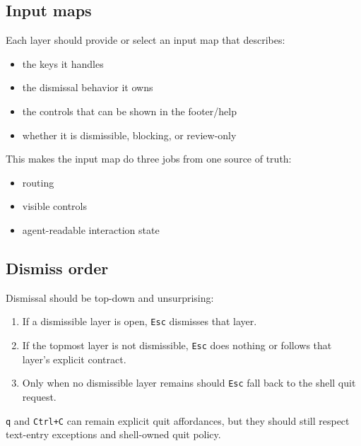 \subsection{Input maps}\label{record-254-input-maps}

Each layer should provide or select an input map that describes:

\begin{itemize}
\tightlist
\item
  the keys it handles
\item
  the dismissal behavior it owns
\item
  the controls that can be shown in the footer/help
\item
  whether it is dismissible, blocking, or review-only
\end{itemize}

This makes the input map do three jobs from one source of truth:

\begin{itemize}
\tightlist
\item
  routing
\item
  visible controls
\item
  agent-readable interaction state
\end{itemize}

\subsection{Dismiss order}\label{record-254-dismiss-order}

Dismissal should be top-down and unsurprising:

\begin{enumerate}
\def\labelenumi{\arabic{enumi}.}
\tightlist
\item
  If a dismissible layer is open, \texttt{E\allowbreak{}s\allowbreak{}c} dismisses that layer.
\item
  If the topmost layer is not dismissible, \texttt{E\allowbreak{}s\allowbreak{}c} does nothing or follows that layer's explicit contract.
\item
  Only when no dismissible layer remains should \texttt{E\allowbreak{}s\allowbreak{}c} fall back to the shell quit request.
\end{enumerate}

\texttt{q} and \texttt{C\allowbreak{}t\allowbreak{}r\allowbreak{}l\allowbreak{}+\allowbreak{}C} can remain explicit quit affordances, but they should still respect text-entry exceptions and shell-owned quit policy.

